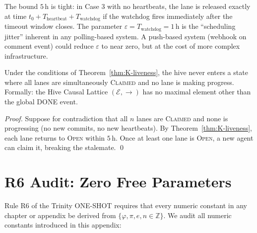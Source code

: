 \begin{remark}
\label{rem:K-tightness}
The bound $5\,\text{h}$ is tight: in Case 3 with no heartbeats,
the lane is released exactly at time $t_0 + T_{\text{heartbeat}} + T_{\text{watchdog}}$
if the watchdog fires immediately after the timeout window closes.
The parameter $\varepsilon = T_{\text{watchdog}} = 1\,\text{h}$ is
the ``scheduling jitter'' inherent in any polling-based system.
A push-based system (webhook on comment event) could reduce
$\varepsilon$ to near zero, but at the cost of more complex
infrastructure.
\end{remark}

\begin{corollary}
\label{cor:K-no-deadlock}
Under the conditions of Theorem~\ref{thm:K-liveness}, the hive never
enters a state where all lanes are simultaneously \textsc{Claimed} and
no lane is making progress. Formally: the Hive Causal Lattice
$(\mathcal{E}, \to)$ has no maximal element other than the global DONE
event.
\end{corollary}
\begin{proof}
Suppose for contradiction that all $n$ lanes are \textsc{Claimed} and
none is progressing (no new commits, no new heartbeats). By
Theorem~\ref{thm:K-liveness}, each lane returns to \textsc{Open}
within $5\,\text{h}$. Once at least one lane is \textsc{Open}, a new
agent can claim it, breaking the stalemate.
\qed
\end{proof}


\section{R6 Audit: Zero Free Parameters}
\label{sec:K-r6-audit}

Rule R6 of the Trinity ONE-SHOT requires that every numeric constant in
any chapter or appendix be derived from $\{\varphi, \pi, e, n \in \mathbb{Z}\}$.
We audit all numeric constants introduced in this appendix:

